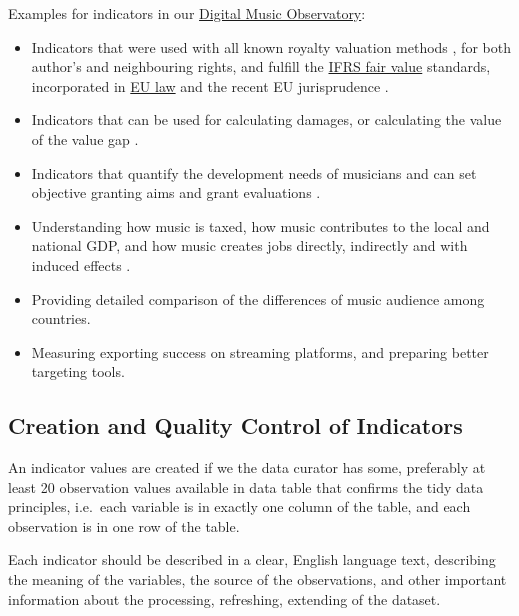 \documentclass[
  a4paper,
  openany, a4paper, oneside]{book}
\begin{document}
Examples for indicators in our \href{https://music.dataobservatory.eu/}{Digital Music Observatory}:

\begin{itemize}
\item
  Indicators that were used with all known royalty valuation methods \citep{pwc_valuing_2008}, for both author's and neighbouring rights, and fulfill the \href{https://www.ifrs.org/issued-standards/list-of-standards/ifrs-13-fair-value-measurement/}{IFRS fair value} standards, incorporated in \href{https://eur-lex.europa.eu/legal-content/EN/TXT/HTML/?uri=CELEX:32012R1255\&from=EN\%7D}{EU law} and the recent EU jurisprudence \citep{cjeu_osa_2014, cjeu_akka_2017}.
\item
  Indicators that can be used for calculating damages, or calculating the value of the value gap \citep{antal_pcr_croatia_2019, antal_szabad_2019_en}.
\item
  Indicators that quantify the development needs of musicians and can set objective granting aims and grant evaluations \citep{antal_javaslatok_2015}.
\item
  Understanding how music is taxed, how music contributes to the local and national GDP, and how music creates jobs directly, indirectly and with induced effects \citep{antal_slovenskom_hudobnom_2019}.
\item
  Providing detailed comparison of the differences of music audience among countries.
\item
  Measuring exporting success on streaming platforms, and preparing better targeting tools.
\end{itemize}

\hypertarget{authoring-indicator}{%
\subsection{Creation and Quality Control of Indicators}\label{authoring-indicator}}

An indicator values are created if we the data curator has some, preferably at least 20 observation values available in data table that confirms the tidy data principles, i.e.~each variable is in exactly one column of the table, and each observation is in one row of the table.

Each indicator should be described in a clear, English language text, describing the meaning of the variables, the source of the observations, and other important information about the processing, refreshing, extending of the dataset.
\end{document}
